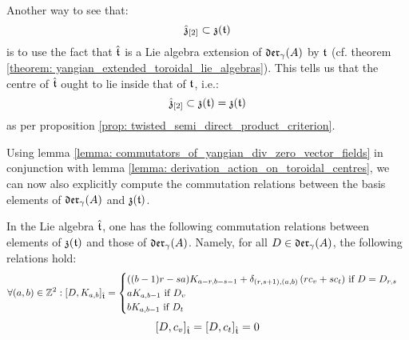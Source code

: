 \begin{remark}
            Another way to see that:
                $$\hat{\mathfrak{z}}_{[2]} \subset \mathfrak{z}(\mathfrak{t})$$
            is to use the fact that $\hat{\mathfrak{t}}$ is a Lie algebra extension of $\mathfrak{der}_{\gamma}(A)$ by $\mathfrak{t}$ (cf. theorem \ref{theorem: yangian_extended_toroidal_lie_algebras}). This tells us that the centre of $\hat{\mathfrak{t}}$ ought to lie inside that of $\mathfrak{t}$, i.e.:
                $$\hat{\mathfrak{z}}_{[2]} \subset \mathfrak{z}(\mathfrak{t}) = \mathfrak{z}(\mathfrak{t})$$
            as per proposition \ref{prop: twisted_semi_direct_product_criterion}.
        \end{remark}

        Using lemma \ref{lemma: commutators_of_yangian_div_zero_vector_fields} in conjunction with lemma \ref{lemma: derivation_action_on_toroidal_centres}, we can now also explicitly compute the commutation relations between the basis elements of $\mathfrak{der}_{\gamma}(A)$ and $\mathfrak{z}(\mathfrak{t})$.
        \begin{lemma} \label{lemma: explicit_commutators_between_central_basis_elements_and_derivations}
            In the Lie algebra $\hat{\mathfrak{t}}$, one has the following commutation relations between elements of $\mathfrak{z}(\mathfrak{t})$ and those of $\mathfrak{der}_{\gamma}(A)$. Namely, for all $D \in \mathfrak{der}_{\gamma}(A)$, the following relations hold:
                $$
                    \forall (a, b) \in \mathbb{Z}^2: [D, K_{a, b}]_{\hat{\mathfrak{t}}} =
                    \begin{cases}
                        \text{$((b - 1)r - sa) K_{a - r, b - s - 1} + \delta_{(r, s + 1), (a, b)} \left( r c_v + s c_t \right)$ if $D = D_{r, s}$}
                        \\
                        \text{$a K_{a, b - 1}$ if $D_v$}
                        \\
                        \text{$b K_{a, b - 1}$ if $D_t$}
                    \end{cases}
                $$
                $$[D, c_v]_{\hat{\mathfrak{t}}} = [D, c_t]_{\hat{\mathfrak{t}}} = 0$$
        \end{lemma}
